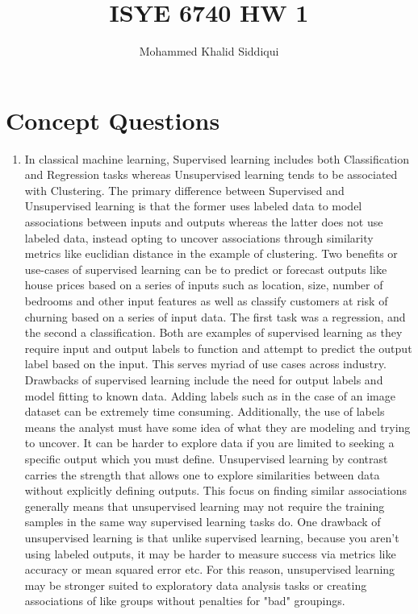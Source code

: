 \documentclass[twoside,10pt]{article}
\begin{document}
\title{ISYE 6740 HW 1}
\author{Mohammed Khalid Siddiqui}
\date{}

\section{Concept Questions}

\begin{enumerate}

\item In classical machine learning, Supervised learning includes both Classification and Regression
tasks whereas Unsupervised learning tends to be associated with Clustering. The primary difference between
Supervised and Unsupervised learning is that the former uses labeled data to model associations between
inputs and outputs whereas the latter does not use labeled data, instead opting to uncover associations
through similarity metrics like euclidian distance in the example of clustering. Two benefits or use-cases
of supervised learning can be to predict or forecast outputs like house prices based on a series of inputs
such as location, size, number of bedrooms and other input features as well as classify customers at risk
of churning based on a series of input data. The first task was a regression, and the second a classification.
Both are examples of supervised learning as they require input and output labels to function and attempt
to predict the output label based on the input. This serves myriad of use cases across industry. Drawbacks of
supervised learning include the need for output labels and model fitting to known data. Adding labels
such as in the case of an image dataset can be extremely time consuming. Additionally, the use of labels means
the analyst must have some idea of what they are modeling and trying to uncover. It can be harder to explore
data if you are limited to seeking a specific output which you must define. Unsupervised learning by contrast
carries the strength that allows one to explore similarities between data without explicitly defining outputs.
This focus on finding similar associations generally means that unsupervised learning may not require the training
samples in the same way supervised learning tasks do. One drawback of unsupervised learning is that unlike
supervised learning, because you aren't using labeled outputs, it may be harder to measure success via metrics like
accuracy or mean squared error etc. For this reason, unsupervised learning may be stronger suited to
exploratory data analysis tasks or creating associations of like groups without penalties for "bad" groupings.


\end{enumerate}
\end{document}
